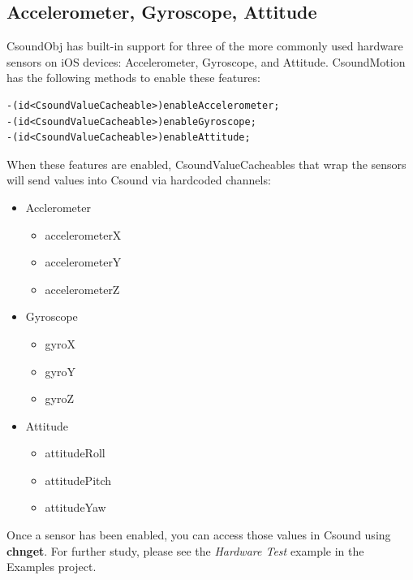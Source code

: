 \documentclass[11pt]{article}
\begin{document}
\subsection{Accelerometer, Gyroscope, Attitude}

CsoundObj has built-in support for three of the more commonly used hardware sensors on iOS devices: Accelerometer, Gyroscope, and Attitude. CsoundMotion has the following methods to enable these features:


\begin{lstlisting}[caption=CsoundObj Hardware Sensor Methods]
-(id<CsoundValueCacheable>)enableAccelerometer;
-(id<CsoundValueCacheable>)enableGyroscope;
-(id<CsoundValueCacheable>)enableAttitude; 
\end{lstlisting}

When these features are enabled, CsoundValueCacheables that wrap the sensors will send values into Csound via hardcoded channels:

\begin{itemize}

\item Acclerometer
\begin{itemize}
\item accelerometerX
\item accelerometerY
\item accelerometerZ
\end{itemize}

\item Gyroscope 
\begin{itemize}
\item gyroX
\item gyroY
\item gyroZ
\end{itemize}

\item Attitude 
\begin{itemize}
\item attitudeRoll
\item attitudePitch
\item attitudeYaw
\end{itemize}

\end{itemize} 

Once a sensor has been enabled, you can access those values in Csound using \textbf{chnget}. For further study, please see the \emph{Hardware Test} example in the Examples project. 

\end{document}
